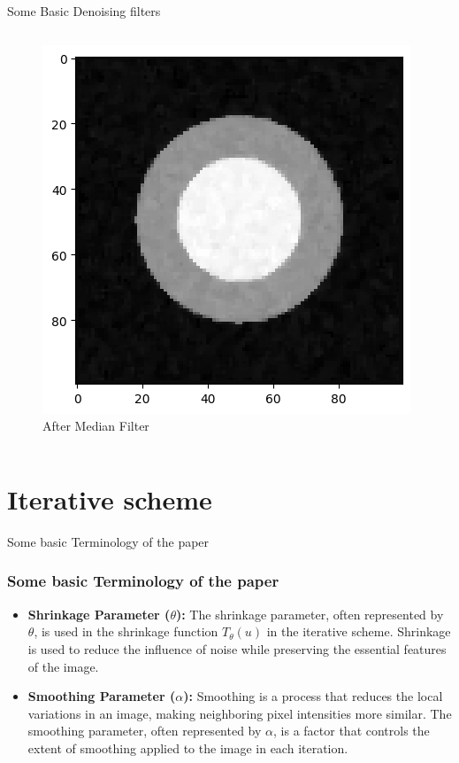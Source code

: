 \documentclass{beamer}
\begin{document}
\begin{frame}{Some Basic Denoising filters}
\begin{columns}
        \begin{figure}
            \centering
            \includegraphics[scale = 0.4]{img/medain.png}
            \caption{After Median Filter}
            \label{fig:dual fig demo 2}
        \end{figure}
\end{columns} 

\end{frame}
\section{Iterative scheme}

\begin{frame}{Some basic Terminology of the paper}
\frametitle{Some basic Terminology of the paper}
    \begin{itemize}
        \item \textbf{Shrinkage Parameter ($\theta$):} The shrinkage parameter, often represented by $\theta$, is used in the shrinkage function $T_{\theta}(u)$ in the iterative scheme. Shrinkage is used to reduce the influence of noise while preserving the essential features of the image.
        \item \textbf{Smoothing Parameter ($\alpha$):}  Smoothing is a process that reduces the local variations in an image, making neighboring pixel intensities more similar. The smoothing parameter, often represented by $\alpha$, is a factor that controls the extent of smoothing applied to the image in each iteration. 
        
    \end{itemize}
\end{frame}
\end{document}
